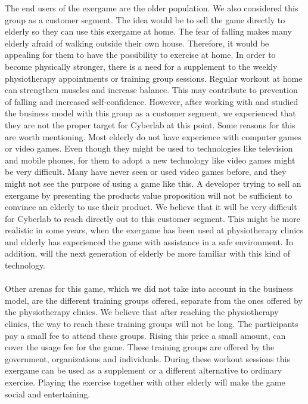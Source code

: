 The end users of the exergame are the older population. We also considered this group as a customer segment. The idea would be to sell the game directly to elderly so they can use this exergame at home. The fear of falling makes many elderly afraid of walking outside their own house. Therefore, it would be appealing for them to have the possibility to exercise at home. In order to become physically stronger, there is a need for a supplement to the weekly physiotherapy appointments or training group sessions. Regular workout at home can strengthen muscles and increase balance.  This may contribute to prevention of falling and increased self-confidence. However, after working with and studied the business model with this group as a customer segment, we experienced that they are not the proper target for Cyberlab at this point. Some reasons for this are worth mentioning. Most elderly do not have experience with computer games or video games. Even though they might be used to technologies like television and mobile phones, for them to adopt a new technology like video games might be very difficult. Many have never seen or used video games before, and they might not see the purpose of using a game like this. A developer trying to sell an exergame by presenting the products value proposition will not be sufficient to convince an elderly to use their product. We believe that it will be very difficult for Cyberlab to reach directly out to this customer segment. This might be more realistic in some years, when the exergame has been used at physiotherapy clinics and elderly has experienced the game with assistance in a safe environment. In addition, will the next generation of elderly be more familiar with this kind of technology.  \\ \\
Other arenas for this game, which we did not take into account in the business model, are the different training groups offered, separate from the ones offered by the physiotherapy clinics. We believe that after reaching the physiotherapy clinics, the way to reach these training groups will not be long. The participants pay a small fee to attend these groups. Rising this price a small amount, can cover the usage fee for the game. These training groups are offered by the government, organizations and individuals. During these workout sessions this exergame can be used as a supplement or a different alternative to ordinary exercise. Playing the exercise together with other elderly will make the game social and entertaining. \\ \\
